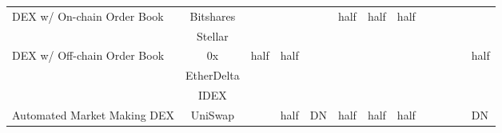 \begin{table}[t]
\begin{tabular}{|l|c|p{0.4cm}|p{0.4cm}|p{0.4cm}|p{0.4cm}|p{0.4cm}|p{0.4cm}|p{0.4cm}|p{0.4cm}|p{0.4cm}|p{0.4cm}|p{0.4cm}|}
\multirow{2}{*}{DEX w/ On-chain Order Book }      	& Bitshares		&\multirow{2}{*}{\full }		&\multirow{2}{*}{\full }		&\multirow{2}{*}{\prt }		&\multirow{2}{*}{half }		&\multirow{2}{*}{half }		&\multirow{2}{*}{half } 		&\multirow{2}{*}{\full }		&\multirow{2}{*}{\full }		&\multirow{2}{*}{\full }		&\multirow{2}{*}{\full }		&\multirow{2}{*}{\full } 		\\ 													
											&Stellar			& 						&						&						&						&						&						&						&						&						& 						&						\\  \hline						
\multirow{3}{*}{DEX w/ Off-chain Order Book}        &0x				&\multirow{3}{*}{half}		&\multirow{3}{*}{half }		&\multirow{3}{*}{\full }		&\multirow{3}{*}{\full }		&\multirow{3}{*}{\full }		&\multirow{3}{*}{\full } 		&\multirow{3}{*}{\prt }		&\multirow{3}{*}{\full }		&\multirow{3}{*}{\full }		&\multirow{3}{*}{\prt }		&\multirow{3}{*}{half } 		\\ 
							                      	&EtherDelta		& 						&						&						&						&						&						&						&						&						& 						&						\\
										       &IDEX     		& 						&						&						&						&						&						&						&						&						& 						&						\\ \hline
\multirow{3}{*}{Automated Market Making DEX}    &UniSwap		&\multirow{3}{*}{\full}		&\multirow{3}{*}{half }		&\multirow{3}{*}{ DN}		&\multirow{3}{*}{half}		&\multirow{3}{*}{ half}		&\multirow{3}{*}{half} 		&\multirow{3}{*}{ \full}		&\multirow{3}{*}{ \prt}		&\multirow{3}{*}{\full }		&\multirow{3}{*}{ \full}		&\multirow{3}{*}{ DN} 		\\ 

\end{tabular}
\end{table}
